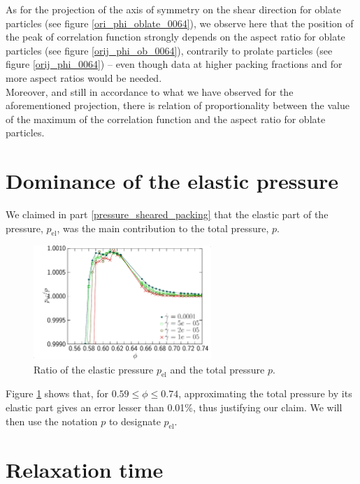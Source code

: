 \documentclass[class=report, float=false, crop=false]{standalone}
\begin{document}
As for the projection of the axis of symmetry on the shear direction for oblate particles (see figure \ref{ori_phi_oblate_0064}), we observe here that the position of the peak of correlation function strongly depends on the aspect ratio for oblate particles (see figure \ref{orij_phi_ob_0064}), contrarily to prolate particles (see figure \ref{orij_phi_0064}) -- even though data at higher packing fractions and for more aspect ratios would be needed.\\

Moreover, and still in accordance to what we have observed for the aforementioned projection, there is relation of proportionality between the value of the maximum of the correlation function and the aspect ratio for oblate particles.

\section{Dominance of the elastic pressure}

We claimed in part \ref{pressure_sheared_packing} that the elastic part of the pressure, $p_{\text{el}}$, was the main contribution to the total pressure, $p$.

\begin{figure}[h!]
\centering
\includegraphics[width=0.6\textwidth]{figures/figs/pe_ptot-zoom-phi}
\caption{Ratio of the elastic pressure $p_{\text{el}}$ and the total pressure $p$.}
\label{pe_ptot-zoom-phi}
\end{figure}

Figure \ref{pe_ptot-zoom-phi} shows that, for $0.59\le\phi\le0.74$, approximating the total pressure by its elastic part gives an error lesser than 0.01\%, thus justifying our claim. We will then use the notation $p$ to designate $p_{\text{el}}$.

\section{Relaxation time}
\end{document}
